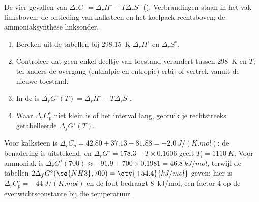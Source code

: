 \begin{omfigure}

{\small De vier gevallen van $\Delta_r G^\circ = \Delta_r H^\circ - T\Delta_r
S^\circ$ (). Verbrandingen staan in het vak linksboven;
de ontleding van kalksteen en het koelpack rechtsboven; de
ammoniaksynthese linksonder.}
\end{omfigure}

\begin{method}\label{met:b2:reaction-free-energy:delta-g-standard}
\begin{enumerate}
  \item Bereken uit de tabellen bij \qty{298.15}{K} $\Delta_r H^\circ$ en
        $\Delta_r S^\circ$.
  \item Controleer dat geen enkel deeltje van toestand verandert tussen \qty{298}{K} en $T$;
        tel anders de overgang (enthalpie en entropie) erbij of vertrek vanuit
        de nieuwe toestand.
  \item In de  is $\Delta_r G^\circ(T) = \Delta_r H^\circ
        - T\Delta_r S^\circ$.
  \item Waar $\Delta_r C^\circ_p$ niet klein is of het interval lang,
        gebruik je rechtstreeks getabelleerde $\Delta_f G^\circ(T)$.
\end{enumerate}
\end{method}

\begin{example}\label{ex:b2:reaction-free-energy:tests}
Voor kalksteen is $\Delta_r C^\circ_p = 42.80 + 37.13 - 81.88 =
\qty{-2.0}{J/(K.mol)}$: de benadering is uitstekend, en $\Delta_r
G^\circ = 178.3 - T \times 0.1606$ geeft $T_i = \qty{1110}{K}$. Voor ammoniak
is $\Delta_r G^\circ(700) \approx -91.9 + 700 \times 0.1981 =
\qty{+46.8}{kJ/mol}$, terwijl de tabellen $2\Delta_f G^\circ(\ce{NH3}, 700) =
\qty{+54.4}{kJ/mol}$ geven: hier is $\Delta_r C^\circ_p = \qty{-44}{J/(K.mol)}$ en
de fout bedraagt \qty{8}{kJ/mol}, een factor 4 op de evenwichtsconstante bij
die temperatuur.
\end{example}

